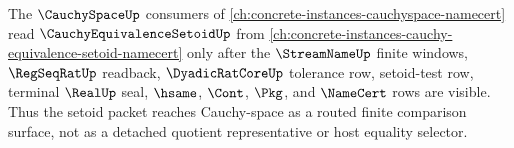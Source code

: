 The $\CauchySpaceUp$ consumers of \autoref{ch:concrete-instances-cauchyspace-namecert} read $\CauchyEquivalenceSetoidUp$ from \autoref{ch:concrete-instances-cauchy-equivalence-setoid-namecert} only after the $\StreamNameUp$ finite windows, $\RegSeqRatUp$ readback, $\DyadicRatCoreUp$ tolerance row, setoid-test row, terminal $\RealUp$ seal, $\hsame$, $\Cont$, $\Pkg$, and $\NameCert$ rows are visible. Thus the setoid packet reaches Cauchy-space as a routed finite comparison surface, not as a detached quotient representative or host equality selector.
